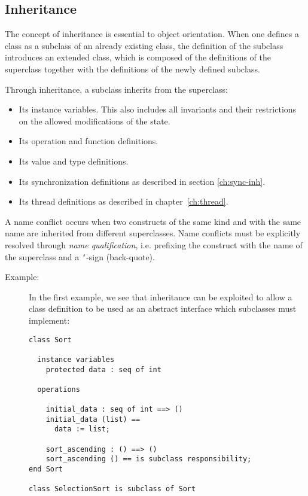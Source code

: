 \documentclass{overturerepchap}
\begin{document}
{\subsection{Inheritance}\label{ch:inherit}

The concept of inheritance is essential to object orientation.  When
one defines a class as a subclass of an already existing class, the
definition of the subclass introduces an extended class, which is
composed of the definitions of the superclass together with the
definitions of the newly defined subclass.

Through inheritance, a subclass inherits from the superclass:
\begin{itemize}
\item Its instance variables. %
  This also includes
  all invariants and their restrictions on the allowed modifications of
  the state.
\item Its operation and function definitions.
\item Its value and type definitions.
\item Its synchronization definitions as described in
  section \ref{ch:sync-inh}.
\item Its thread definitions as described in
  chapter~\ref{ch:thread}.
\end{itemize}

A name conflict occurs when two constructs of the same kind and with the
same name are inherited from different superclasses.
Name conflicts must be explicitly resolved through {\it name qualification},
i.e. prefixing the construct with the name of the superclass and a
\texttt{`}-sign (back-quote).

\begin{description}
\item[Example:] In the first example, we see that inheritance can be
exploited to allow a class definition to be used as an abstract
interface which subclasses must implement:
  \begin{lstlisting}
class Sort

  instance variables
    protected data : seq of int

  operations

    initial_data : seq of int ==> ()
    initial_data (list) ==
      data := list;

    sort_ascending : () ==> ()
    sort_ascending () == is subclass responsibility;
end Sort

class SelectionSort is subclass of Sort


\end{lstlisting}
\end{description}}
\end{document}
